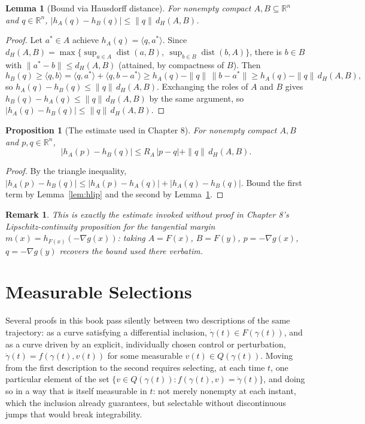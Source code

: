 \documentclass[11pt]{report}
\newtheorem{proposition}{Proposition}[chapter]
\newtheorem{lemma}{Lemma}[chapter]
\newtheorem{remark}{Remark}[chapter]
\begin{document}
\begin{lemma}[Bound via Hausdorff distance]
\label{lem:hhaus}
For nonempty compact $A, B \subseteq \mathbb{R}^n$ and $q \in \mathbb{R}^n$,
$|h_A(q) - h_B(q)| \leq \|q\|\, d_H(A,B)$.
\end{lemma}
\begin{proof}
Let $a^\ast \in A$ achieve $h_A(q) = \langle q, a^\ast \rangle$. Since
$d_H(A,B) = \max\{\sup_{a \in A} \operatorname{dist}(a,B),\ \sup_{b \in B} \operatorname{dist}(b,A)\}$,
there is $b \in B$ with $\|a^\ast - b\| \leq d_H(A,B)$ (attained, by
compactness of $B$). Then
\[
h_B(q) \geq \langle q, b \rangle = \langle q, a^\ast \rangle + \langle q, b - a^\ast \rangle \geq h_A(q) - \|q\|\,\|b-a^\ast\| \geq h_A(q) - \|q\|\, d_H(A,B),
\]
so $h_A(q) - h_B(q) \leq \|q\|\,d_H(A,B)$. Exchanging the roles of $A$
and $B$ gives $h_B(q) - h_A(q) \leq \|q\|\,d_H(A,B)$ by the same
argument, so $|h_A(q)-h_B(q)| \leq \|q\|\,d_H(A,B)$.
\end{proof}

\begin{proposition}[The estimate used in Chapter 8]
For nonempty compact $A,B$ and $p,q \in \mathbb{R}^n$,
\[
|h_A(p) - h_B(q)| \leq R_A\,|p-q| + \|q\|\, d_H(A,B).
\]
\end{proposition}
\begin{proof}
By the triangle inequality, $|h_A(p)-h_B(q)| \leq |h_A(p)-h_A(q)| +
|h_A(q)-h_B(q)|$. Bound the first term by Lemma~\ref{lem:hlip} and the
second by Lemma~\ref{lem:hhaus}.
\end{proof}

\begin{remark}
This is exactly the estimate invoked without proof in Chapter 8's
Lipschitz-continuity proposition for the tangential margin $m(x) =
h_{F(x)}(-\nabla g(x))$: taking $A = F(x)$, $B = F(y)$,
$p = -\nabla g(x)$, $q = -\nabla g(y)$ recovers the bound used there
verbatim.
\end{remark}

\chapter{Measurable Selections}

Several proofs in this book pass silently between two descriptions of
the same trajectory: as a curve satisfying a differential inclusion,
$\dot\gamma(t) \in F(\gamma(t))$, and as a curve driven by an explicit,
individually chosen control or perturbation, $\dot\gamma(t) =
f(\gamma(t), v(t))$ for some measurable $v(t) \in Q(\gamma(t))$. Moving
from the first description to the second requires selecting, at each
time $t$, one particular element of the set
$\{v \in Q(\gamma(t)) : f(\gamma(t),v) = \dot\gamma(t)\}$, and doing so
in a way that is itself measurable in $t$: not merely nonempty at
each instant, which the inclusion already guarantees, but selectable
without discontinuous jumps that would break integrability.
\end{document}
